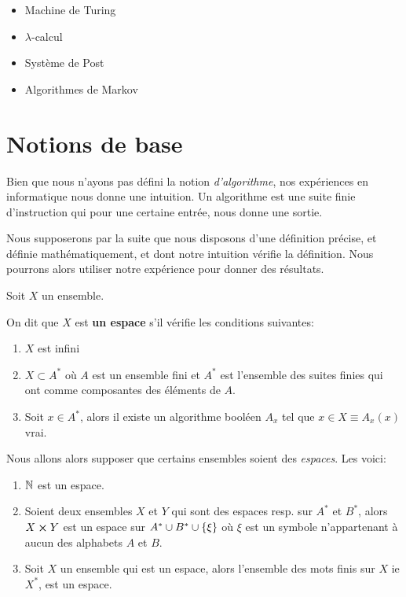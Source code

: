 \begin{itemize}
	\item Machine de Turing
	\item $\lambda$-calcul
	\item Système de Post
	\item Algorithmes de Markov
\end{itemize}

\section{Notions de base}

Bien que nous n'ayons pas défini la notion \textit{d'algorithme}, nos
expériences en informatique nous donne une intuition. Un algorithme est une
suite finie d'instruction qui pour une certaine entrée, nous donne une sortie.

Nous supposerons par la suite que nous disposons d'une définition précise, et
définie mathématiquement, et dont notre intuition vérifie la définition.
Nous pourrons alors utiliser notre expérience pour donner des résultats.

\begin{definition}
	Soit $X$ un ensemble.

	On dit que $X$ est \textbf{un espace} s'il vérifie les conditions suivantes:

	\begin{enumerate}
		\item $X$ est infini
		\item $X \subset A^{*}$ où $A$ est un ensemble fini et $A^{*}$ est
			l'ensemble des suites finies qui ont comme composantes des éléments
			de $A$.
		\item Soit $x \in A^{*}$, alors il existe un algorithme booléen $A_{x}$ tel que
			$x \in X \equiv A_{x}(x)$ vrai.
	\end{enumerate}
\end{definition}

Nous allons alors supposer que certains ensembles soient des \textit{espaces}.
Les voici:

\begin{enumerate}
	\item $\mathbb{N}$ est un espace.
	\item Soient deux ensembles $X$ et $Y$ qui sont des espaces resp. sur $A^{*}
		$ et $B^{*}$, alors $X \cross Y$ est un espace sur $A^{*} \cup
		B^{*} \cup \left\{ \xi \right\}$ où $\xi$ est un symbole n'appartenant à
		aucun des alphabets $A$ et $B$.
	\item Soit $X$ un ensemble qui est un espace, alors l'ensemble des mots
		finis sur $X$ ie $X^{*}$, est un espace.
\end{enumerate}

